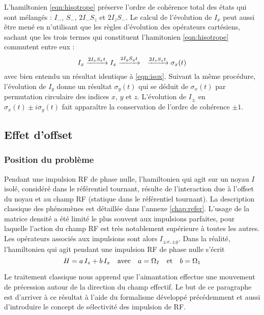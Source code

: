 L'hamiltonien \ref{eqn:hisotrope} préserve l'ordre de cohérence total des états
qui sont mélangés : $I_-$, $S_-$, $2I_-S_z$ et $2I_zS_-$.
Le calcul de l'évolution de $I_x$ peut aussi être mené en n'utilisant que les règles
d'évolution des opérateurs cartésiens, sachant que les trois termes qui
constituent l'hamitonien \ref{eqn:hisotrope} commutent entre eux :
\begin{equation}
I_x \xrightarrow{2I_xS_x t} I_x
\xrightarrow{2I_yS_y t} \quad
\xrightarrow{2I_zS_z t}
\sigma_x(t)
\end{equation}
avec bien entendu un résultat identique à \ref{eqn:isox}.
Suivant la même procédure, l'évolution de $I_y$ donne un résultat
$\sigma_y(t)$ qui se déduit de $\sigma_x(t)$ par permutation circulaire
des indices $x$, $y$ et $z$.
L'évolution de $I_{\pm}$ en $\sigma_x(t) \pm i\sigma_y(t)$ fait apparaître la
conservation de l'ordre de cohérence $\pm 1$.

\subsection{Effet d'offset}

\subsubsection{Position du problème}
Pendant une impulsion RF de phase nulle, l'hamiltonien qui agit sur un noyau $I$ isolé,
considéré dans le référentiel tournant, résulte de l'interaction due à l'offset
du noyau et au champ RF (statique dans le référentiel tournant).
La description classique des phénomènes est détaillée dans l'annexe \ref{chap:refer}.
L'usage de la matrice densité a été limité le plus souvent aux impulsions parfaites,
pour laquelle l'action du champ RF est très notablement supérieure à toutes les autres.
Les opérateurs associés aux impulsions sont alors $I_{\pm x, \pm y}$.
Dans la réalité, l'hamiltonien qui agit pendant une impulsion RF de phase nulle s'écrit
\begin{equation}
H = a \, I_z + b \, I_x \quad \mbox{avec} \quad a = \Omega_I
\quad \mbox{et} \quad b = \Omega_1
\end{equation}

Le traitement classique nous apprend que l'aimantation effectue une mouvement
de précession autour de la direction du champ effectif.
Le but de ce paragraphe est d'arriver à ce résultat à l'aide du formalisme
développé précédemment et aussi d'introduire le concept de sélectivité
des impulsion de RF.

